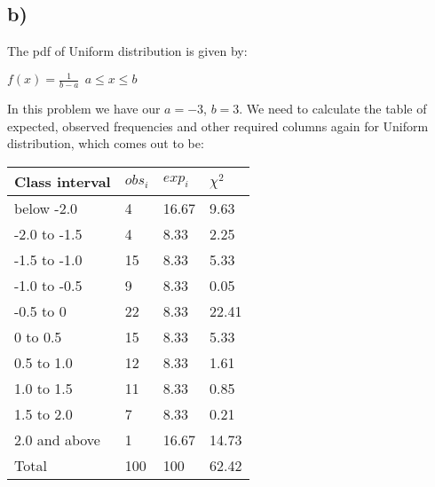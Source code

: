 \documentclass[12pt]{article}
\begin{document}
\subsection*{b)}
The pdf of Uniform distribution is given by:
\begin{center}
$f(x) = \frac{1}{b-a} \ \ a \leq x \leq b$ \\
\end{center}

In this problem we have our $a=-3$, $b=3$. We need to calculate the table of expected, observed frequencies and other required columns again for Uniform distribution, which comes out to be: 

\begin{table}[h]
\begin{tabular}{|l|l|l|l|}
\hline
Class interval & $obs_i$ & $exp_i$ & $\chi^2$ \\ \hline
below -2.0     & 4      & 16.67  & 9.63                                   \\ \hline
-2.0 to -1.5   & 4      & 8.33   & 2.25                                   \\ \hline
-1.5 to -1.0   & 15     & 8.33   & 5.33                                   \\ \hline
-1.0 to -0.5   & 9      & 8.33   & 0.05                                   \\ \hline
-0.5 to 0      & 22     & 8.33   & 22.41                                  \\ \hline
0 to 0.5       & 15     & 8.33   & 5.33                                   \\ \hline
0.5 to 1.0     & 12     & 8.33   & 1.61                                   \\ \hline
1.0 to 1.5     & 11     & 8.33   & 0.85                                   \\ \hline
1.5 to 2.0     & 7      & 8.33   & 0.21                                   \\ \hline
2.0 and above  & 1      & 16.67  & 14.73                                  \\ \hline
Total          & 100    & 100    & 62.42                                  \\ \hline
\end{tabular}
\end{table}
\end{document}
